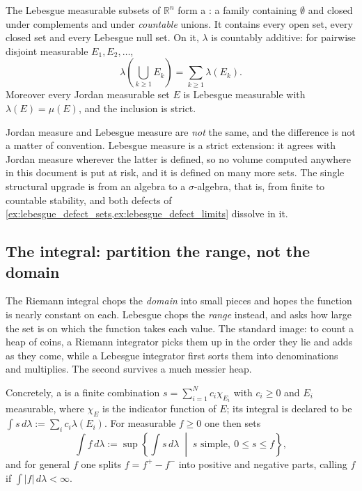 \begin{theorem}
\label{thm:lebesgue_measure_properties}
The Lebesgue measurable subsets of $\mathbb{R}^n$ form a 
: a family containing $\emptyset$ and closed under complements and
under \emph{countable} unions. It contains every open set, every closed set and every Lebesgue null
set. On it, $\lambda$ is countably additive: for pairwise disjoint measurable $E_1,E_2,\dots$,
\[\lambda\left(\bigcup_{k\ge1}E_k\right) = \sum_{k\ge1}\lambda(E_k).\]
Moreover every Jordan measurable set $E$ is Lebesgue measurable with $\lambda(E) = \mu(E)$, and the
inclusion is strict.
\end{theorem}

\begin{remark}
\label{rem:jordan_is_not_lebesgue}
Jordan measure and Lebesgue measure are \emph{not} the same, and the difference is not a matter of
convention. Lebesgue measure is a strict extension: it agrees with Jordan measure wherever the
latter is defined, so no volume computed anywhere in this document is put at risk, and it is
defined on many more sets. The single structural upgrade is from an algebra to a
$\sigma$-algebra, that is, from finite to countable stability, and both defects of
\cref{ex:lebesgue_defect_sets,ex:lebesgue_defect_limits} dissolve in it.
\end{remark}

\subsection{The integral: partition the range, not the domain}

The Riemann integral chops the \emph{domain} into small pieces and hopes the function is nearly
constant on each. Lebesgue chops the \emph{range} instead, and asks how large the set is on which
the function takes each value. The standard image: to count a heap of coins, a Riemann integrator
picks them up in the order they lie and adds as they come, while a Lebesgue integrator first sorts
them into denominations and multiplies. The second survives a much messier heap.

Concretely, a  is a finite combination $s = \sum_{i=1}^N c_i \chi_{E_i}$
with $c_i \ge 0$ and $E_i$ measurable, where $\chi_E$ is the indicator function of $E$; its
integral is declared to be $\int s \,d\lambda := \sum_i c_i \lambda(E_i)$. For measurable
$f \ge 0$ one then sets
\[\int f \,d\lambda := \sup\left\{ \int s\,d\lambda \;\middle|\; s \text{ simple},\ 0 \le s \le f
\right\},\]
and for general $f$ one splits $f = f^+ - f^-$ into positive and negative parts, calling $f$
 if $\int\lvert f\rvert\,d\lambda < \infty$.

